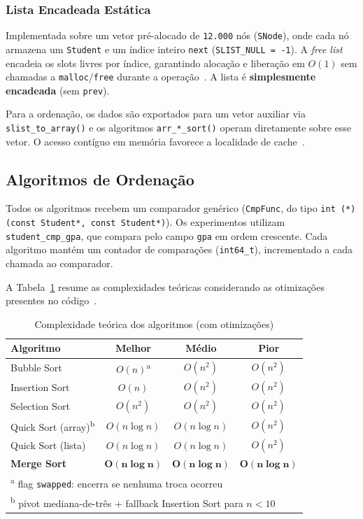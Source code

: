 \documentclass[conference]{IEEEtran}
\begin{document}
\subsubsection{Lista Encadeada Estática}
Implementada sobre um vetor pré-alocado de \texttt{12.000} nós
(\texttt{SNode}), onde cada nó armazena um \texttt{Student} e um índice
inteiro \texttt{next} (\texttt{SLIST\_NULL = -1}). A \textit{free list}
encadeia os slots livres por índice, garantindo alocação e liberação em
$O(1)$ sem chamadas a \texttt{malloc}/\texttt{free} durante a
operação~\cite{preiss1998}. A lista é \textbf{simplesmente encadeada}
(sem \texttt{prev}).

Para a ordenação, os dados são exportados para um vetor auxiliar via
\texttt{slist\_to\_array()} e os algoritmos \texttt{arr\_*\_sort()} operam
diretamente sobre esse vetor. O acesso contíguo em memória favorece a
localidade de cache~\cite{preiss1998}.

\subsection{Algoritmos de Ordenação}

Todos os algoritmos recebem um comparador genérico (\texttt{CmpFunc},
do tipo \texttt{int (*)(const Student*, const Student*)}). Os experimentos
utilizam \texttt{student\_cmp\_gpa}, que compara pelo campo \texttt{gpa}
em ordem crescente. Cada algoritmo mantém um contador de comparações
(\texttt{int64\_t}), incrementado a cada chamada ao comparador.

A Tabela~\ref{tab:complexidade} resume as complexidades teóricas
considerando as otimizações presentes no código~\cite{knuth1998}.

\begin{table}[tbp]
\caption{Complexidade teórica dos algoritmos (com otimizações)}
\label{tab:complexidade}
\centering
\renewcommand{\arraystretch}{1.15}
\begin{tabular}{lccc}
\toprule
\textbf{Algoritmo} & \textbf{Melhor} & \textbf{Médio} & \textbf{Pior} \\
\midrule
Bubble Sort    & $O(n)$\textsuperscript{a}
               & $O(n^{2})$   & $O(n^{2})$ \\
Insertion Sort & $O(n)$       & $O(n^{2})$   & $O(n^{2})$ \\
Selection Sort & $O(n^{2})$   & $O(n^{2})$   & $O(n^{2})$ \\
Quick Sort (array)\textsuperscript{b}
               & $O(n\log n)$ & $O(n\log n)$ & $O(n^{2})$ \\
Quick Sort (lista)
               & $O(n\log n)$ & $O(n\log n)$ & $O(n^{2})$ \\
\textbf{Merge Sort}
               & $\mathbf{O(n\log n)}$
               & $\mathbf{O(n\log n)}$
               & $\mathbf{O(n\log n)}$ \\
\bottomrule
\multicolumn{4}{l}{\footnotesize \textsuperscript{a} flag \texttt{swapped}: encerra se nenhuma troca ocorreu} \\
\multicolumn{4}{l}{\footnotesize \textsuperscript{b} pivot mediana-de-três + fallback Insertion Sort para $n < 10$}
\end{tabular}
\end{table}
\end{document}
